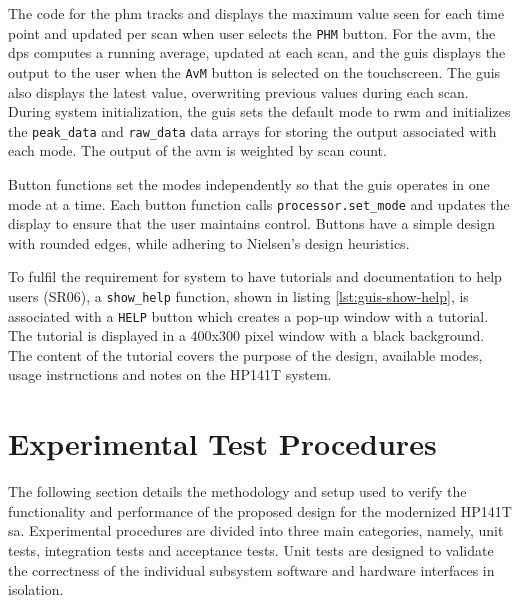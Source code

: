 \documentclass[class=report,11pt,crop=false]{standalone}
\begin{document}
	The code for the \acrshort{phm} tracks and displays the maximum value seen for each time point and updated per scan when user selects the \texttt{PHM} button. For the \acrshort{avm}, the \acrshort{dps} computes a running average, updated at each scan, and the \acrshort{guis} displays the output to the user when the \texttt{AvM} button is selected on the touchscreen. The \acrshort{guis} also displays the latest value, overwriting previous values during each scan. During system initialization, the \acrshort{guis} sets the default mode to \acrshort{rwm} and initializes the \texttt{peak\_data} and \texttt{raw\_data} data arrays for storing the output associated with each mode. The output of the \acrshort{avm} is weighted by scan count.
	
	Button functions set the modes independently so that the \acrshort{guis} operates in one mode at a time. Each button function calls \texttt{processor.set\_mode} and updates the display to ensure that the user maintains control. Buttons have a simple design with rounded edges, while adhering to Nielsen's design heuristics. 
	
	To fulfil the requirement for system to have tutorials and documentation to help users (SR06), a \texttt{show\_help} function, shown in listing \ref{lst:guis-show-help}, is associated with a \texttt{HELP} button which creates a pop-up window with a tutorial. The tutorial is displayed in a 400x300 pixel window with a black background. The content of the tutorial covers the purpose of the design, available modes, usage instructions and notes on the HP141T system. 
	
	\section{Experimental Test Procedures}
	
	The following section details the methodology and setup used to verify the functionality and performance of the proposed design for the modernized HP141T \acrshort{sa}. Experimental procedures are divided into three main categories, namely, unit tests, integration tests and acceptance tests. Unit tests are designed to validate the correctness of the individual subsystem software and hardware interfaces in isolation. 
	
\end{document}
